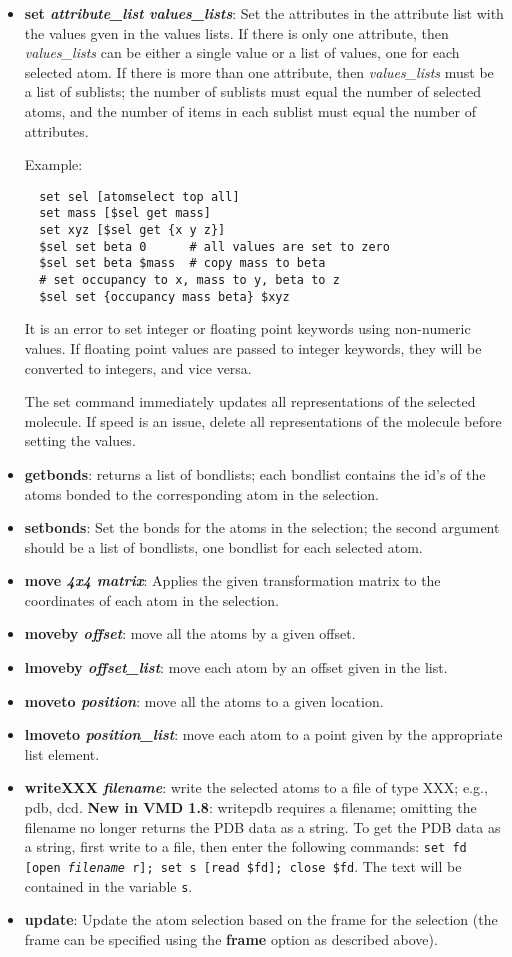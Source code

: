 \begin{itemize}
\begin{itemize}
\item {\bf set {\it attribute\_list} {\it values\_lists}}: Set the attributes
	in the attribute list with the values gven in the values lists.  
  If there is only one attribute, then {\it values\_lists} can be either
  a single value or a list of values, one for each selected atom.
  If there is more than one attribute, then {\it values\_lists} must be a
  list of sublists; the number of sublists must equal the number of selected
  atoms, and the number of items in each sublist must equal the number of
  attributes.  

  Example:
\begin{verbatim}
  set sel [atomselect top all]
  set mass [$sel get mass]
  set xyz [$sel get {x y z}]
  $sel set beta 0      # all values are set to zero
  $sel set beta $mass  # copy mass to beta
  # set occupancy to x, mass to y, beta to z
  $sel set {occupancy mass beta} $xyz 
\end{verbatim}

It is an error to set integer or floating point keywords using non-numeric
values.  If floating point values are passed to integer keywords, they will
be converted to integers, and vice versa.

The set command immediately updates all representations of the selected 
molecule.  If speed is an issue, delete all representations of the molecule
before setting the values.

\item {\bf getbonds}: returns a list of bondlists; each bondlist contains the 
	id's of the atoms bonded to the corresponding atom in the selection.
\item {\bf setbonds}: Set the bonds for the atoms in the selection; the second 
	argument should be a list of bondlists, one bondlist for each 
	selected atom.
\item {\bf move {\it 4x4 matrix}}: Applies the given transformation matrix to
	the coordinates of each atom in the selection. 
\item {\bf moveby {\it offset}}: move all the atoms by a given offset.
\item {\bf lmoveby {\it offset\_list}}: move each atom by an offset given in the list.
\item {\bf moveto {\it position}}: move all the atoms to a given location. 
\item {\bf lmoveto {\it position\_list}}: move each atom to a point given by the appropriate list 
	element.
\item {\bf writeXXX {\it filename}}: 
\label{ug:ui:text:atomselect:writexxx}
write the selected atoms to a file of type XXX; e.g., pdb, dcd.
      {\bf New in VMD 1.8}: writepdb requires a filename; omitting the filename
no longer returns the PDB data as a string.  To get the PDB data as a string,
first write to a file, then enter the following commands: {\tt set fd [open 
{\it filename} r]; set s [read \$fd]; close \$fd}.  The text will be contained in the
variable {\tt s}.
\item {\bf update}: Update the atom selection based on the frame for the
      selection (the frame can be specified using the {\bf frame} option as
      described above). 
    

\end{itemize}
\end{itemize}
